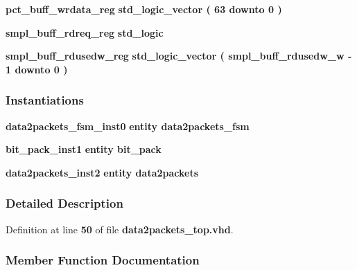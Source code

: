 \begin{DoxyCompactItemize}
\item 
{\bf pct\+\_\+buff\+\_\+wrdata\+\_\+reg} {\bfseries \textcolor{comment}{std\+\_\+logic\+\_\+vector}\textcolor{vhdlchar}{ }\textcolor{vhdlchar}{(}\textcolor{vhdlchar}{ }\textcolor{vhdlchar}{ } \textcolor{vhdldigit}{63} \textcolor{vhdlchar}{ }\textcolor{keywordflow}{downto}\textcolor{vhdlchar}{ }\textcolor{vhdlchar}{ } \textcolor{vhdldigit}{0} \textcolor{vhdlchar}{ }\textcolor{vhdlchar}{)}\textcolor{vhdlchar}{ }} 
\item 
{\bf smpl\+\_\+buff\+\_\+rdreq\+\_\+reg} {\bfseries \textcolor{comment}{std\+\_\+logic}\textcolor{vhdlchar}{ }} 
\item 
{\bf smpl\+\_\+buff\+\_\+rdusedw\+\_\+reg} {\bfseries \textcolor{comment}{std\+\_\+logic\+\_\+vector}\textcolor{vhdlchar}{ }\textcolor{vhdlchar}{(}\textcolor{vhdlchar}{ }\textcolor{vhdlchar}{ }\textcolor{vhdlchar}{ }\textcolor{vhdlchar}{ }{\bfseries {\bf smpl\+\_\+buff\+\_\+rdusedw\+\_\+w}} \textcolor{vhdlchar}{-\/}\textcolor{vhdlchar}{ } \textcolor{vhdldigit}{1} \textcolor{vhdlchar}{ }\textcolor{keywordflow}{downto}\textcolor{vhdlchar}{ }\textcolor{vhdlchar}{ } \textcolor{vhdldigit}{0} \textcolor{vhdlchar}{ }\textcolor{vhdlchar}{)}\textcolor{vhdlchar}{ }} 
\end{DoxyCompactItemize}
\subsubsection*{Instantiations}
 \begin{DoxyCompactItemize}
\item 
{\bf data2packets\+\_\+fsm\+\_\+inst0}  {\bfseries entity data2packets\+\_\+fsm}   
\item 
{\bf bit\+\_\+pack\+\_\+inst1}  {\bfseries entity bit\+\_\+pack}   
\item 
{\bf data2packets\+\_\+inst2}  {\bfseries entity data2packets}   
\end{DoxyCompactItemize}


\subsubsection{Detailed Description}


Definition at line {\bf 50} of file {\bf data2packets\+\_\+top.\+vhd}.



\subsubsection{Member Function Documentation}

